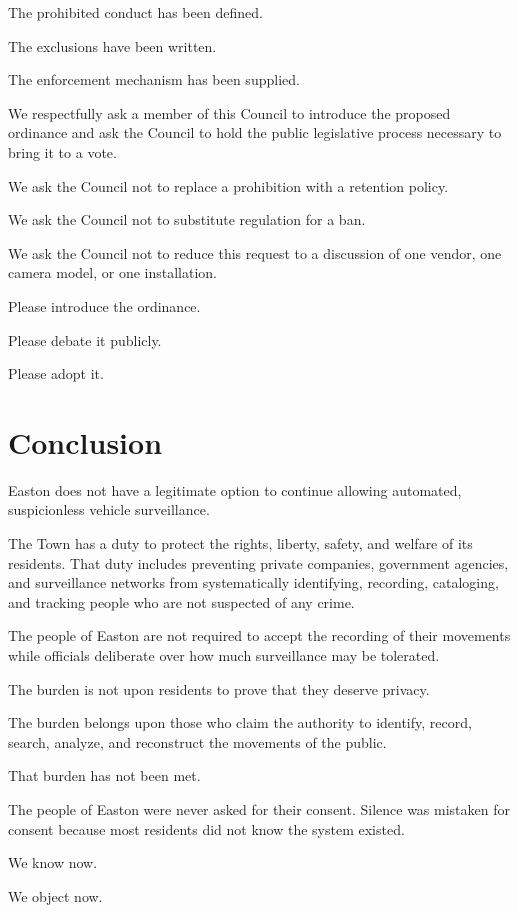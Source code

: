 \documentclass[11pt]{article}
\begin{document}
The prohibited conduct has been defined.

The exclusions have been written.

The enforcement mechanism has been supplied.

We respectfully ask a member of this Council to introduce the proposed ordinance and ask the Council to hold the public legislative process necessary to bring it to a vote.

We ask the Council not to replace a prohibition with a retention policy.

We ask the Council not to substitute regulation for a ban.

We ask the Council not to reduce this request to a discussion of one vendor, one camera model, or one installation.

Please introduce the ordinance.

Please debate it publicly.

Please adopt it.

\section*{Conclusion}
\label{sec:orgc171c1c}

Easton does not have a legitimate option to continue allowing automated, suspicionless vehicle surveillance.

The Town has a duty to protect the rights, liberty, safety, and welfare of its residents. That duty includes preventing private companies, government agencies, and surveillance networks from systematically identifying, recording, cataloging, and tracking people who are not suspected of any crime.

The people of Easton are not required to accept the recording of their movements while officials deliberate over how much surveillance may be tolerated.

The burden is not upon residents to prove that they deserve privacy.

The burden belongs upon those who claim the authority to identify, record, search, analyze, and reconstruct the movements of the public.

That burden has not been met.

The people of Easton were never asked for their consent. Silence was mistaken for consent because most residents did not know the system existed.

We know now.

We object now.
\end{document}

